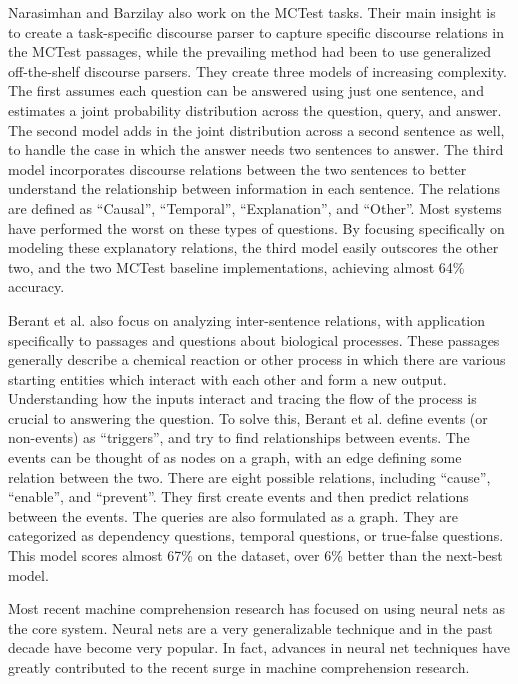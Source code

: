 \documentclass[pageno]{jpaper}
\begin{document}
Narasimhan and Barzilay\cite{Narasimhan2015} also work on the MCTest tasks.
Their main insight is to create a task-specific discourse parser to capture
specific discourse relations in the MCTest passages, while the prevailing
method had been to use generalized off-the-shelf discourse parsers. They create
three models of increasing complexity. The first assumes each question can be
answered using just one sentence, and estimates a joint probability
distribution across the question, query, and answer. The second model adds in
the joint distribution across a second sentence as well, to handle the case in
which the answer needs two sentences to answer. The third model incorporates
discourse relations between the two sentences to better understand the
relationship between information in each sentence. The relations are defined as
``Causal'', ``Temporal'', ``Explanation'', and ``Other''. Most systems have
performed the worst on these types of questions. By focusing specifically on
modeling these explanatory relations, the third model easily outscores the
other two, and the two MCTest baseline implementations, achieving almost 64\%
accuracy.

Berant et al.\cite{Berant2014} also focus on analyzing inter-sentence
relations, with application specifically to passages and questions about
biological processes. These passages generally describe a chemical reaction or
other process in which there are various starting entities which interact with
each other and form a new output. Understanding how the inputs interact and
tracing the flow of the process is crucial to answering the question. To solve
this, Berant et al. define events (or non-events) as ``triggers'', and try to
find relationships between events. The events can be thought of as nodes on a
graph, with an edge defining some relation between the two. There are eight
possible relations, including ``cause'', ``enable'', and ``prevent''. They
first create events and then predict relations between the events. The queries
are also formulated as a graph. They are categorized as dependency questions,
temporal questions, or true-false questions. This model scores almost 67\% on
the dataset, over 6\% better than the next-best model.

Most recent machine comprehension research has focused on using neural nets as
the core system. Neural nets are a very generalizable technique and in the past
decade have become very popular. In fact, advances in neural net techniques have
greatly contributed to the recent surge in machine comprehension research.
\end{document}
